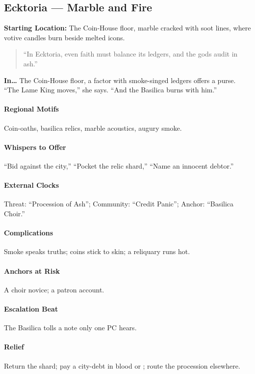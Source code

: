 \subsection*{Ecktoria — Marble and Fire}
\textbf{Starting Location:} The Coin‑House floor, marble cracked with soot lines, where votive candles burn beside melted icons.
\begin{quote}
“In Ecktoria, even faith must balance its ledgers, and the gods audit in ash.”
\end{quote}

\textbf{In…} The Coin-House floor, a factor with smoke-singed ledgers offers a purse. ``The Lame King moves,'' she says. ``And the Basilica burns with him.''
\paragraph{Regional Motifs} Coin-oaths, basilica relics, marble acoustics, augury smoke.
\paragraph{Whispers to Offer} ``Bid against the city,'' ``Pocket the relic shard,'' ``Name an innocent debtor.''
\paragraph{External Clocks} Threat: ``Procession of Ash''; Community: ``Credit Panic''; Anchor: ``Basilica Choir.''
\paragraph{Complications} Smoke speaks truths; coins stick to skin; a reliquary runs hot.
\paragraph{Anchors at Risk} A choir novice; a patron account.
\paragraph{Escalation Beat} The Basilica tolls a note only one PC hears.
\paragraph{Relief} Return the shard; pay a city-debt in blood or \Boons{}; route the procession elsewhere.


